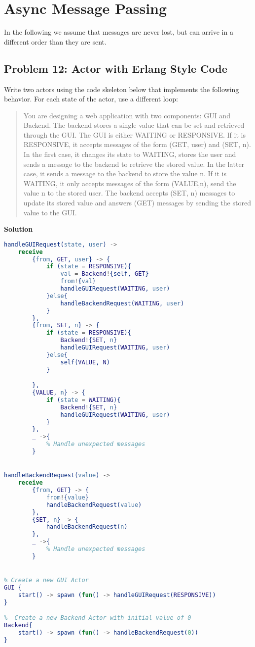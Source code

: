 \section{Async Message Passing}

In the following we assume that messages are never lost, but can arrive in a different order than
they are sent.

\subsection{Problem 12: Actor with Erlang Style Code}

Write two actors using the code skeleton below that implements the
following behavior. For each state of the actor, use a different loop: 

\begin{quote}
    You are designing a web application with two components: GUI and Backend. The
    backend stores a single value that can be set and retrieved through the GUI. The GUI
    is either WAITING or RESPONSIVE. If it is RESPONSIVE, it accepts messages
    of the form (GET, user) and (SET, n). In the first case, it changes its state to
    WAITING, stores the user and sends a message to the backend to retrieve the stored
    value. In the latter case, it sends a message to the backend to store the value n. If
    it is WAITING, it only accepts messages of the form (VALUE,n), send the value n
    to the stored user. The backend accepts (SET, n) messages to update its stored value and answers
    (GET) messages by sending the stored value to the GUI.
\end{quote}

\textbf{Solution}

\begin{lstlisting}[language=erlang]
handleGUIRequest(state, user) -> 
    receive
        {from, GET, user} -> {
            if (state = RESPONSIVE){
                val = Backend!{self, GET}
                from!{val}
                handleGUIRequest(WAITING, user)
            }else{
                handleBackendRequest(WAITING, user)
            }
        },
        {from, SET, n} -> {
            if (state = RESPONSIVE){
                Backend!{SET, n}
                handleGUIRequest(WAITING, user)
            }else{
                self(VALUE, N)
            }

        },
        {VALUE, n} -> {
            if (state = WAITING){
                Backend!{SET, n}
                handleGUIRequest(WAITING, user)
            }
        },
        _ ->{
            % Handle unexpected messages 
        }


handleBackendRequest(value) -> 
    receive 
        {from, GET} -> {
            from!{value}
            handleBackendRequest(value)
        },
        {SET, n} -> {
            handleBackendRequest(n)
        },
        _ ->{
            % Handle unexpected messages
        }


% Create a new GUI Actor
GUI {
    start() -> spawn (fun() -> handleGUIRequest(RESPONSIVE))
}

%  Create a new Backend Actor with initial value of 0 
Backend{
    start() -> spawn (fun() -> handleBackendRequest(0))
}
\end{lstlisting}

